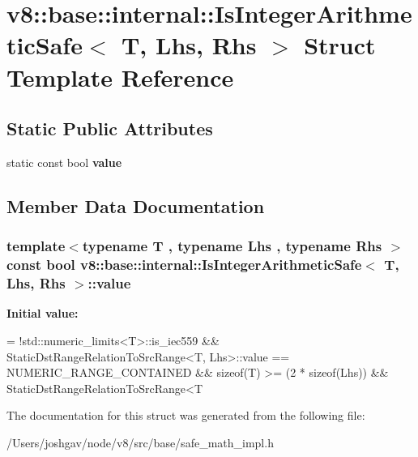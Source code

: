 \hypertarget{structv8_1_1base_1_1internal_1_1_is_integer_arithmetic_safe}{}\section{v8\+:\+:base\+:\+:internal\+:\+:Is\+Integer\+Arithmetic\+Safe$<$ T, Lhs, Rhs $>$ Struct Template Reference}
\label{structv8_1_1base_1_1internal_1_1_is_integer_arithmetic_safe}
\subsection*{Static Public Attributes}
\begin{DoxyCompactItemize}
\item 
static const bool {\bfseries value}
\end{DoxyCompactItemize}


\subsection{Member Data Documentation}
\subsubsection[{\texorpdfstring{value}{value}}]{\setlength{\rightskip}{0pt plus 5cm}template$<$typename T , typename Lhs , typename Rhs $>$ const bool {\bf v8\+::base\+::internal\+::\+Is\+Integer\+Arithmetic\+Safe}$<$ T, Lhs, Rhs $>$\+::value\hspace{0.3cm}{\ttfamily [static]}}\hypertarget{structv8_1_1base_1_1internal_1_1_is_integer_arithmetic_safe_a52e992f56789e94edf26f3c7d20eb0eb}{}\label{structv8_1_1base_1_1internal_1_1_is_integer_arithmetic_safe_a52e992f56789e94edf26f3c7d20eb0eb}
{\bfseries Initial value\+:}
\begin{DoxyCode}
= !std::numeric\_limits<T>::is\_iec559 &&
                            StaticDstRangeRelationToSrcRange<T, Lhs>::value ==
                                NUMERIC\_RANGE\_CONTAINED &&
                            \textcolor{keyword}{sizeof}(T) >= (2 * \textcolor{keyword}{sizeof}(Lhs)) &&
                            StaticDstRangeRelationToSrcRange<T
\end{DoxyCode}


The documentation for this struct was generated from the following file\+:\begin{DoxyCompactItemize}
\item 
/\+Users/joshgav/node/v8/src/base/safe\+\_\+math\+\_\+impl.\+h\end{DoxyCompactItemize}
